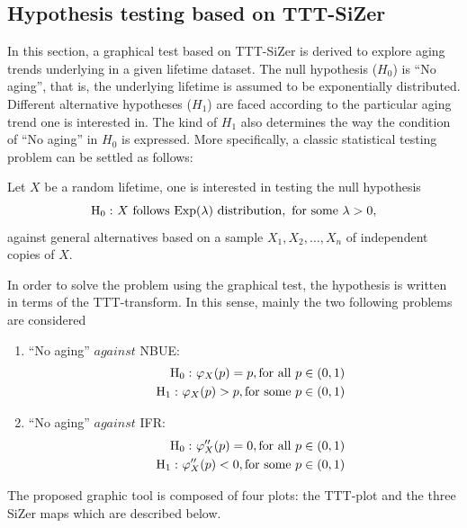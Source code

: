 \documentclass[preprint,12pt]{elsarticle}
\begin{document}
\subsection{Hypothesis testing based on TTT-SiZer}

In this section, a graphical test based on TTT-SiZer is derived to explore aging  trends underlying in a given lifetime dataset. The null hypothesis ($H_0$) is ``No aging'', that is, the underlying lifetime is assumed to be exponentially distributed. Different alternative hypotheses ($H_1$) are faced according to the particular aging trend one is interested in. The kind of $H_1$ also determines the way the condition of ``No aging'' in $H_0$ is expressed. More specifically, a classic statistical testing problem can be settled  as follows:

 \noindent Let $X$ be a random lifetime,  one is interested in testing the null hypothesis 
\[
{\rm H_0 :} \ X \ {\rm follows \ Exp}(\lambda) \ {\rm distribution,\ for \ some \ } \lambda >0,
\]
against general alternatives based on a sample $X_1, X_2,\ldots, X_n$ of independent copies of $X$.

In order to solve the problem using the graphical test, the hypothesis is written in terms of the TTT-transform. In this sense, mainly the two following problems are considered 
\begin{enumerate}

\item ``No aging'' $against$ NBUE:
\begin{eqnarray} \label{test_nbue}
\nonumber &&{\rm H_0 :} \ \varphi_X(p)= p, {\rm for \ all \ } p \in (0,1) \\
&&{\rm H_1 :} \ \varphi_X(p) >  p, {\rm for \ some \ }  p \in (0,1)
\end{eqnarray}


\item ``No aging'' $against$ IFR:
\begin{eqnarray} \label{test_ifr}
\nonumber &&{\rm H_0 :} \ \varphi_X''(p)= 0, {\rm for \ all \ } p \in (0,1) \\
&&{\rm H_1 :} \ \varphi_X''(p) < 0, {\rm for \ some \ }  p \in (0,1)
\end{eqnarray}

\end{enumerate}



The proposed graphic tool is composed of  four plots: the TTT-plot and the three SiZer maps which are described below.
\end{document}
